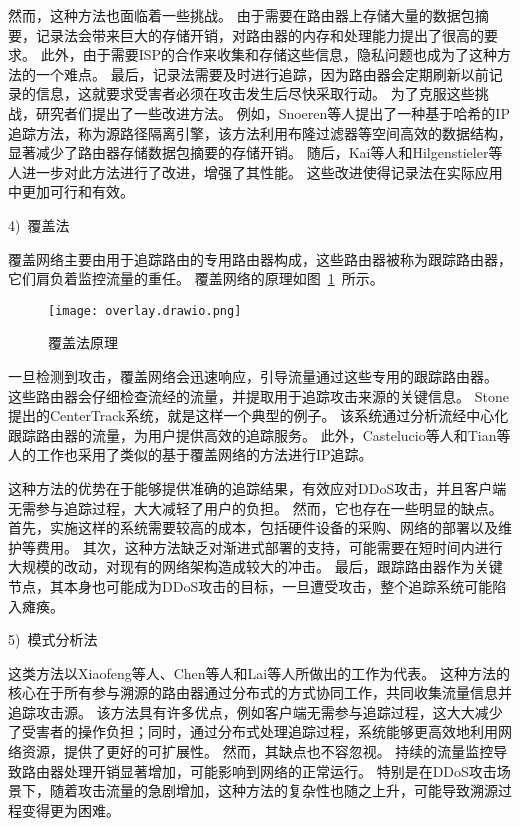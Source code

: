 然而，这种方法也面临着一些挑战。
由于需要在路由器上存储大量的数据包摘要，记录法会带来巨大的存储开销，对路由器的内存和处理能力提出了很高的要求。
此外，由于需要ISP的合作来收集和存储这些信息，隐私问题也成为了这种方法的一个难点。
最后，记录法需要及时进行追踪，因为路由器会定期刷新以前记录的信息，这就要求受害者必须在攻击发生后尽快采取行动。
为了克服这些挑战，研究者们提出了一些改进方法。
例如，Snoeren等人\cite{Snoeren2001}提出了一种基于哈希的IP追踪方法，称为源路径隔离引擎，该方法利用布隆过滤器等空间高效的数据结构，显著减少了路由器存储数据包摘要的存储开销。
随后，Kai等人\cite{Kai2009}和Hilgenstieler等人\cite{Hilgenstieler2010}进一步对此方法进行了改进，增强了其性能。
这些改进使得记录法在实际应用中更加可行和有效。\par

4)~覆盖法\par
覆盖网络主要由用于追踪路由的专用路由器构成，这些路由器被称为跟踪路由器，它们肩负着监控流量的重任。
覆盖网络的原理如图~\ref{fig:overlay}~所示。
\begin{figure}[htbp]
  \centering
  \texttt{[image: overlay.drawio.png]}
  \caption{覆盖法原理}
  \label{fig:overlay}
\end{figure}
一旦检测到攻击，覆盖网络会迅速响应，引导流量通过这些专用的跟踪路由器。
这些路由器会仔细检查流经的流量，并提取用于追踪攻击来源的关键信息。
Stone提出的CenterTrack系统，就是这样一个典型的例子。
该系统通过分析流经中心化跟踪路由器的流量，为用户提供高效的追踪服务\cite{stone2000centertrack}。
此外，Castelucio等人\cite{castelucio2009aslevel}和Tian等人\cite{tian2011easytrace}的工作也采用了类似的基于覆盖网络的方法进行IP追踪。\par

这种方法的优势在于能够提供准确的追踪结果，有效应对DDoS攻击，并且客户端无需参与追踪过程，大大减轻了用户的负担。
然而，它也存在一些明显的缺点。
首先，实施这样的系统需要较高的成本，包括硬件设备的采购、网络的部署以及维护等费用。
其次，这种方法缺乏对渐进式部署的支持，可能需要在短时间内进行大规模的改动，对现有的网络架构造成较大的冲击。
最后，跟踪路由器作为关键节点，其本身也可能成为DDoS攻击的目标，一旦遭受攻击，整个追踪系统可能陷入瘫痪。


5)~模式分析法\par
这类方法以Xiaofeng等人\cite{xiaofeng2004mechanism}、Chen等人\cite{chen2006tracing}和Lai等人\cite{lai2008antbased}所做出的工作为代表。
这种方法的核心在于所有参与溯源的路由器通过分布式的方式协同工作，共同收集流量信息并追踪攻击源。
该方法具有许多优点，例如客户端无需参与追踪过程，这大大减少了受害者的操作负担；同时，通过分布式处理追踪过程，系统能够更高效地利用网络资源，提供了更好的可扩展性。
然而，其缺点也不容忽视。
持续的流量监控导致路由器处理开销显著增加，可能影响到网络的正常运行。
特别是在DDoS攻击场景下，随着攻击流量的急剧增加，这种方法的复杂性也随之上升，可能导致溯源过程变得更为困难。


